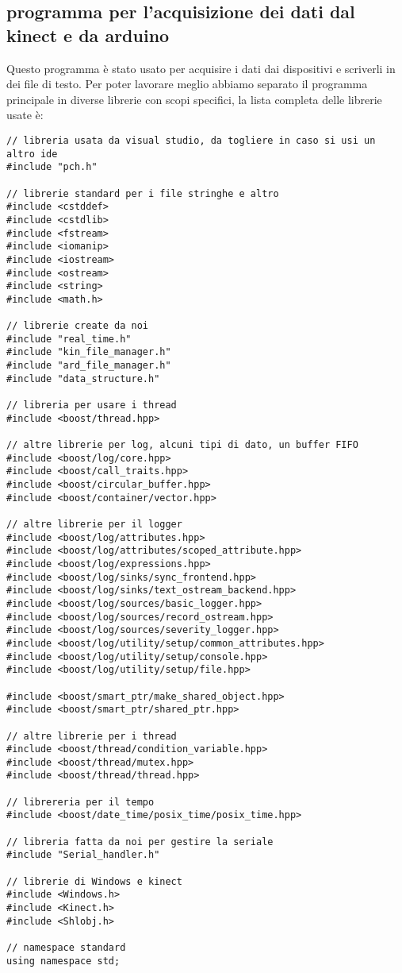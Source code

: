 \documentclass[10pt,a4paper]{article}
\begin{document}
\subsection{programma per l'acquisizione dei dati dal kinect e da arduino}
Questo programma \`e stato usato per acquisire i dati dai dispositivi e scriverli in dei file di testo. Per poter lavorare meglio abbiamo separato il programma principale in diverse librerie con scopi specifici, la lista completa delle librerie usate \`e:
\begin{lstlisting}[style=mycpp, caption=librerie usate, captionpos=b]
// libreria usata da visual studio, da togliere in caso si usi un altro ide
#include "pch.h"

// librerie standard per i file stringhe e altro
#include <cstddef>
#include <cstdlib>
#include <fstream>
#include <iomanip>
#include <iostream>
#include <ostream>
#include <string>
#include <math.h>

// librerie create da noi
#include "real_time.h"
#include "kin_file_manager.h"
#include "ard_file_manager.h"
#include "data_structure.h"

// libreria per usare i thread
#include <boost/thread.hpp>

// altre librerie per log, alcuni tipi di dato, un buffer FIFO
#include <boost/log/core.hpp>
#include <boost/call_traits.hpp>
#include <boost/circular_buffer.hpp>
#include <boost/container/vector.hpp>

// altre librerie per il logger
#include <boost/log/attributes.hpp>
#include <boost/log/attributes/scoped_attribute.hpp>
#include <boost/log/expressions.hpp>
#include <boost/log/sinks/sync_frontend.hpp>
#include <boost/log/sinks/text_ostream_backend.hpp>
#include <boost/log/sources/basic_logger.hpp>
#include <boost/log/sources/record_ostream.hpp>
#include <boost/log/sources/severity_logger.hpp>
#include <boost/log/utility/setup/common_attributes.hpp>
#include <boost/log/utility/setup/console.hpp>
#include <boost/log/utility/setup/file.hpp>

#include <boost/smart_ptr/make_shared_object.hpp>
#include <boost/smart_ptr/shared_ptr.hpp>

// altre librerie per i thread 
#include <boost/thread/condition_variable.hpp>
#include <boost/thread/mutex.hpp>
#include <boost/thread/thread.hpp>

// librereria per il tempo
#include <boost/date_time/posix_time/posix_time.hpp>

// libreria fatta da noi per gestire la seriale
#include "Serial_handler.h"

// librerie di Windows e kinect 
#include <Windows.h>
#include <Kinect.h>
#include <Shlobj.h>

// namespace standard
using namespace std;
\end{lstlisting}
\end{document}
